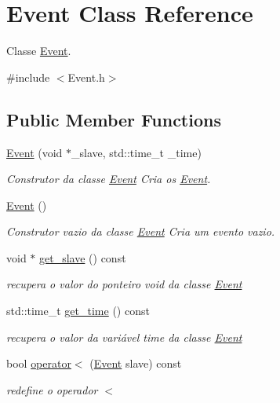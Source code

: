 \hypertarget{class_event}{}\section{Event Class Reference}
\label{class_event}


Classe \hyperlink{class_event}{Event}.  




{\ttfamily \#include $<$Event.\+h$>$}

\subsection*{Public Member Functions}
\begin{DoxyCompactItemize}
\item 
\hyperlink{class_event_aa4f1957692689f154f5f62f6c811dea2}{Event} (void $\ast$\+\_\+slave, std\+::time\+\_\+t \+\_\+time)
\begin{DoxyCompactList}\small\item\em Construtor da classe \hyperlink{class_event}{Event} Cria os \hyperlink{class_event}{Event}. \end{DoxyCompactList}\item 
\hyperlink{class_event_a5a40dd4708297f7031e29b39e039ae10}{Event} ()
\begin{DoxyCompactList}\small\item\em Construtor vazio da classe \hyperlink{class_event}{Event} Cria um evento vazio. \end{DoxyCompactList}\item 
void $\ast$ \hyperlink{class_event_a01de1d8ecbc8a0274b75822888cc8aad}{get\+\_\+slave} () const 
\begin{DoxyCompactList}\small\item\em recupera o valor do ponteiro void da classe \hyperlink{class_event}{Event} \end{DoxyCompactList}\item 
std\+::time\+\_\+t \hyperlink{class_event_a93534d78213f6bcb8651e6a8f11ed53a}{get\+\_\+time} () const 
\begin{DoxyCompactList}\small\item\em recupera o valor da variável time da classe \hyperlink{class_event}{Event} \end{DoxyCompactList}\item 
bool \hyperlink{class_event_a3e609dfa8eb5637d3ba9f7037c1927a9}{operator$<$} (\hyperlink{class_event}{Event} slave) const 
\begin{DoxyCompactList}\small\item\em redefine o operador $<$ \end{DoxyCompactList}\end{DoxyCompactItemize}


